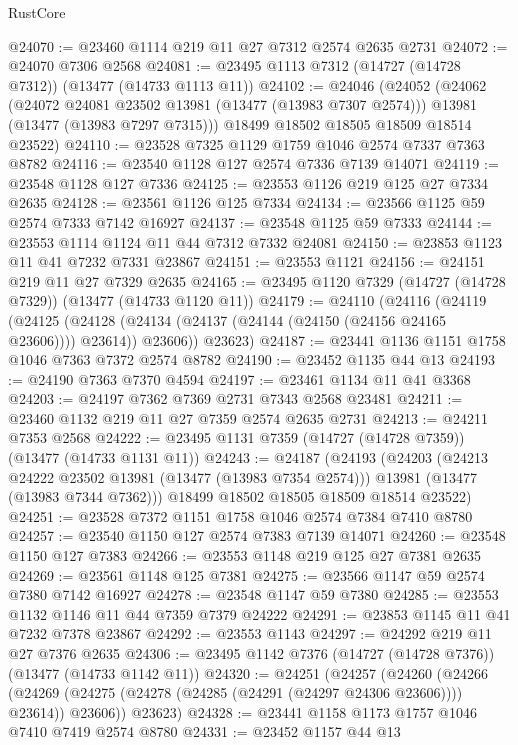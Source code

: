 \begin{lexlean}{RustCore}
\begin{coremodule}
@24070 := @23460 @1114 @219 @11 @27 @7312 @2574 @2635 @2731
@24072 := @24070 @7306 @2568
@24081 := @23495 @1113 @7312 (@14727 (@14728 @7312)) (@13477 (@14733 @1113 @11))
@24102 := @24046
    (@24052
      (@24062
        (@24072 @24081 @23502 @13981 (@13477 (@13983 @7307 @2574)))
        @13981
        (@13477 (@13983 @7297 @7315)))
      @18499
      @18502
      @18505
      @18509
      @18514
      @23522)
@24110 := @23528 @7325 @1129 @1759 @1046 @2574 @7337 @7363 @8782
@24116 := @23540 @1128 @127 @2574 @7336 @7139 @14071
@24119 := @23548 @1128 @127 @7336
@24125 := @23553 @1126 @219 @125 @27 @7334 @2635
@24128 := @23561 @1126 @125 @7334
@24134 := @23566 @1125 @59 @2574 @7333 @7142 @16927
@24137 := @23548 @1125 @59 @7333
@24144 := @23553 @1114 @1124 @11 @44 @7312 @7332 @24081
@24150 := @23853 @1123 @11 @41 @7232 @7331 @23867
@24151 := @23553 @1121
@24156 := @24151 @219 @11 @27 @7329 @2635
@24165 := @23495 @1120 @7329 (@14727 (@14728 @7329)) (@13477 (@14733 @1120 @11))
@24179 := @24110
    (@24116
      (@24119
        (@24125 (@24128 (@24134 (@24137 (@24144 (@24150 (@24156 @24165 @23606)))) @23614)) @23606))
      @23623)
@24187 := @23441 @1136 @1151 @1758 @1046 @7363 @7372 @2574 @8782
@24190 := @23452 @1135 @44 @13
@24193 := @24190 @7363 @7370 @4594
@24197 := @23461 @1134 @11 @41 @3368
@24203 := @24197 @7362 @7369 @2731 @7343 @2568 @23481
@24211 := @23460 @1132 @219 @11 @27 @7359 @2574 @2635 @2731
@24213 := @24211 @7353 @2568
@24222 := @23495 @1131 @7359 (@14727 (@14728 @7359)) (@13477 (@14733 @1131 @11))
@24243 := @24187
    (@24193
      (@24203
        (@24213 @24222 @23502 @13981 (@13477 (@13983 @7354 @2574)))
        @13981
        (@13477 (@13983 @7344 @7362)))
      @18499
      @18502
      @18505
      @18509
      @18514
      @23522)
@24251 := @23528 @7372 @1151 @1758 @1046 @2574 @7384 @7410 @8780
@24257 := @23540 @1150 @127 @2574 @7383 @7139 @14071
@24260 := @23548 @1150 @127 @7383
@24266 := @23553 @1148 @219 @125 @27 @7381 @2635
@24269 := @23561 @1148 @125 @7381
@24275 := @23566 @1147 @59 @2574 @7380 @7142 @16927
@24278 := @23548 @1147 @59 @7380
@24285 := @23553 @1132 @1146 @11 @44 @7359 @7379 @24222
@24291 := @23853 @1145 @11 @41 @7232 @7378 @23867
@24292 := @23553 @1143
@24297 := @24292 @219 @11 @27 @7376 @2635
@24306 := @23495 @1142 @7376 (@14727 (@14728 @7376)) (@13477 (@14733 @1142 @11))
@24320 := @24251
    (@24257
      (@24260
        (@24266 (@24269 (@24275 (@24278 (@24285 (@24291 (@24297 @24306 @23606)))) @23614)) @23606))
      @23623)
@24328 := @23441 @1158 @1173 @1757 @1046 @7410 @7419 @2574 @8780
@24331 := @23452 @1157 @44 @13

\end{coremodule}
\end{lexlean}
